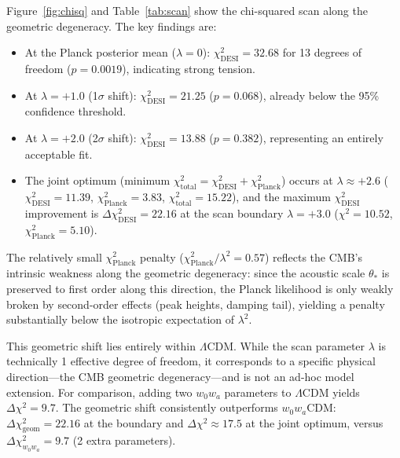 \documentclass[12pt,preprint]{aastex631}
\begin{document}
Figure~\ref{fig:chisq} and Table~\ref{tab:scan} show the chi-squared scan along the geometric degeneracy. The key findings are:

\begin{itemize}
\item At the Planck posterior mean ($\lambda=0$): $\chi^2_{\mathrm{DESI}} = 32.68$ for 13 degrees of freedom ($p = 0.0019$), indicating strong tension.
\item At $\lambda = +1.0$ (1$\sigma$ shift): $\chi^2_{\mathrm{DESI}} = 21.25$ ($p = 0.068$), already below the 95\% confidence threshold.
\item At $\lambda = +2.0$ (2$\sigma$ shift): $\chi^2_{\mathrm{DESI}} = 13.88$ ($p = 0.382$), representing an entirely acceptable fit.
\item The joint optimum (minimum $\chi^2_{\mathrm{total}} = \chi^2_{\mathrm{DESI}} + \chi^2_{\mathrm{Planck}}$) occurs at $\lambda \approx +2.6$ ($\chi^2_{\mathrm{DESI}} = 11.39$, $\chi^2_{\mathrm{Planck}} = 3.83$, $\chi^2_{\mathrm{total}} = 15.22$), and the maximum $\chi^2_{\mathrm{DESI}}$ improvement is $\Delta\chi^2_{\mathrm{DESI}} = 22.16$ at the scan boundary $\lambda = +3.0$ ($\chi^2 = 10.52$, $\chi^2_{\mathrm{Planck}} = 5.10$).
\end{itemize}

The relatively small $\chi^2_{\mathrm{Planck}}$ penalty ($\chi^2_{\mathrm{Planck}}/\lambda^2 = 0.57$) reflects the CMB's intrinsic weakness along the geometric degeneracy: since the acoustic scale $\theta_*$ is preserved to first order along this direction, the Planck likelihood is only weakly broken by second-order effects (peak heights, damping tail), yielding a penalty substantially below the isotropic expectation of $\lambda^2$.

This geometric shift lies entirely within $\Lambda$CDM. While the scan parameter $\lambda$ is technically 1 effective degree of freedom, it corresponds to a specific physical direction---the CMB geometric degeneracy---and is not an ad-hoc model extension. For comparison, adding two $w_0 w_a$ parameters to $\Lambda$CDM yields $\Delta\chi^2 = 9.7$. The geometric shift consistently outperforms $w_0 w_a$CDM: $\Delta\chi^2_{\mathrm{geom}} = 22.16$ at the boundary and $\Delta\chi^2 \approx 17.5$ at the joint optimum, versus $\Delta\chi^2_{w_0 w_a} = 9.7$ (2 extra parameters).
\end{document}

